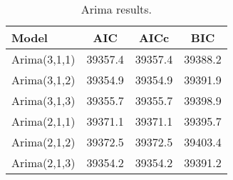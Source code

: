 \begin{table}[ht]
\centering
\caption[Arima results.]{Arima results.} 
\label{tab:chp_ts:arima_res_r}
\begin{tabular}{lccc}
  \toprule Model & AIC & AICc & BIC \\ 
  \midrule Arima(3,1,1) & 39357.4 & 39357.4 & 39388.2 \\ 
  Arima(3,1,2) & 39354.9 & 39354.9 & 39391.9 \\ 
  Arima(3,1,3) & 39355.7 & 39355.7 & 39398.9 \\ 
  Arima(2,1,1) & 39371.1 & 39371.1 & 39395.7 \\ 
  Arima(2,1,2) & 39372.5 & 39372.5 & 39403.4 \\ 
  Arima(2,1,3) & 39354.2 & 39354.2 & 39391.2 \\ 
   \bottomrule \end{tabular}
\end{table}
